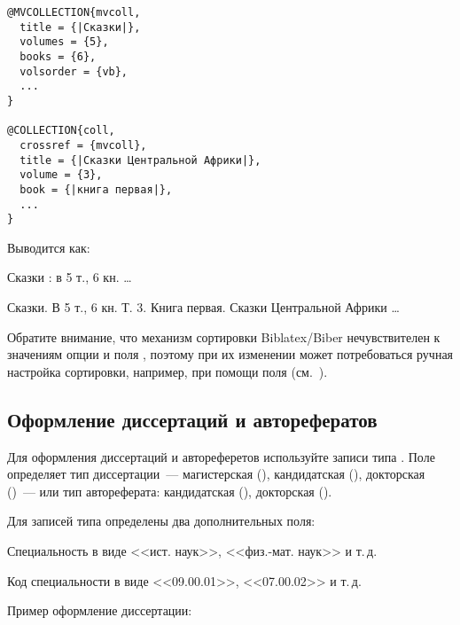 \documentclass[10pt,a4paper,headings=small,numbers=enddot,english,russian]{ltxdockit}[2011/03/25]
\newcommand*{\biber}{Biber\xspace}
\newcommand*{\biblatex}{Biblatex\xspace}
\newenvironment{bibexample}{\begin{list}
     {}
     {\setlength{\leftmargin}{\parindent}%
      \setlength{\itemindent}{-\leftmargin}%
      \setlength{\parsep}{0pt}}}
  {\end{list}}
\begin{document}
\begin{multicols}{2}
\begin{lstlisting}[style=bibtex,escapechar=|]
@MVCOLLECTION{mvcoll,
  title = {|Сказки|},
  volumes = {5},
  books = {6},
  volsorder = {vb},
  ...
}

@COLLECTION{coll,
  crossref = {mvcoll},
  title = {|Сказки Центральной Африки|},
  volume = {3},
  book = {|книга первая|},
  ...
}
\end{lstlisting}
\columnbreak
Выводится как:
\begin{bibexample}
\item Сказки : в 5 т., 6 кн. \ldots
\item Сказки. В 5 т., 6 кн. Т. 3. Книга первая. Сказки Центральной Африки \ldots
\end{bibexample}
\end{multicols}

\bigskip
Обратите внимание, что механизм сортировки \biblatex\unspace\slash\biber
нечувствителен к значениям опции %
и поля , поэтому при их изменении может потребоваться ручная настройка
сортировки, например, при помощи поля  (см.~).

\subsection{Оформление диссертаций и авторефератов}
\label{sec:dissers}

Для оформления диссертаций и автореферетов
используйте записи типа . Поле 
определяет тип диссертации~--- магистерская (), кандидатская (),
докторская ()~--- или тип автореферата: кандидатская (),
докторская ().

Для записей типа  определены два дополнительных поля:

\begin{fieldlist}


Специальность в виде <<ист. наук>>, <<физ.-мат. наук>> и т.\,д.


Код специальности в виде <<09.00.01>>, <<07.00.02>> и т.\,д.

\end{fieldlist}

Пример оформление диссертации:
\end{document}
